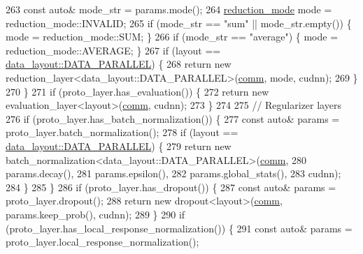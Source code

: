 \begin{DoxyCode}
263     \textcolor{keyword}{const} \textcolor{keyword}{auto}& mode\_str = params.mode();
264     \hyperlink{namespacelbann_a5975e1fb530a267728bfb01dc5c1be9b}{reduction\_mode} mode = reduction\_mode::INVALID;
265     \textcolor{keywordflow}{if} (mode\_str == \textcolor{stringliteral}{"sum"} || mode\_str.empty()) \{ mode = reduction\_mode::SUM; \}
266     \textcolor{keywordflow}{if} (mode\_str == \textcolor{stringliteral}{"average"}) \{ mode = reduction\_mode::AVERAGE; \}
267     \textcolor{keywordflow}{if} (layout == \hyperlink{base_8hpp_a786677cbfb3f5677b4d84f3056eb08dba37d2a3465f7cbf4ab60f4e79944d0638}{data\_layout::DATA\_PARALLEL}) \{
268       \textcolor{keywordflow}{return} \textcolor{keyword}{new} reduction\_layer<data\_layout::DATA\_PARALLEL>(\hyperlink{file__io_8cpp_ab048c6f9fcbcfaa57ce68b00263dbebe}{comm}, mode, cudnn);
269     \}
270   \}
271   \textcolor{keywordflow}{if} (proto\_layer.has\_evaluation()) \{
272     \textcolor{keywordflow}{return} \textcolor{keyword}{new} evaluation\_layer<layout>(\hyperlink{file__io_8cpp_ab048c6f9fcbcfaa57ce68b00263dbebe}{comm}, cudnn);
273   \}
274 
275   \textcolor{comment}{// Regularizer layers}
276   \textcolor{keywordflow}{if} (proto\_layer.has\_batch\_normalization()) \{
277     \textcolor{keyword}{const} \textcolor{keyword}{auto}& params = proto\_layer.batch\_normalization();
278     \textcolor{keywordflow}{if} (layout == \hyperlink{base_8hpp_a786677cbfb3f5677b4d84f3056eb08dba37d2a3465f7cbf4ab60f4e79944d0638}{data\_layout::DATA\_PARALLEL}) \{
279       \textcolor{keywordflow}{return} \textcolor{keyword}{new} batch\_normalization<data\_layout::DATA\_PARALLEL>(\hyperlink{file__io_8cpp_ab048c6f9fcbcfaa57ce68b00263dbebe}{comm},
280                                                                  params.decay(),
281                                                                  params.epsilon(),
282                                                                  params.global\_stats(),
283                                                                  cudnn);
284     \}
285   \}
286   \textcolor{keywordflow}{if} (proto\_layer.has\_dropout()) \{
287     \textcolor{keyword}{const} \textcolor{keyword}{auto}& params = proto\_layer.dropout();
288     \textcolor{keywordflow}{return} \textcolor{keyword}{new} dropout<layout>(\hyperlink{file__io_8cpp_ab048c6f9fcbcfaa57ce68b00263dbebe}{comm}, params.keep\_prob(), cudnn);
289   \}
290   \textcolor{keywordflow}{if} (proto\_layer.has\_local\_response\_normalization()) \{
291     \textcolor{keyword}{const} \textcolor{keyword}{auto}& params = proto\_layer.local\_response\_normalization();

\end{DoxyCode}
